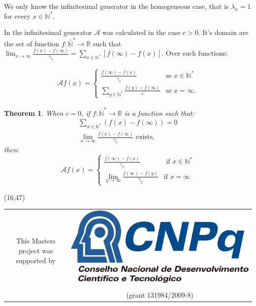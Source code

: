 \documentclass[a1,portrait]{a0poster}
\newtheorem{teorema}{Theorem}
\newcommand{\AAA}{{\mathcal{A}}}
\newcommand{\Nz}{{\mathbb{N^*}}}
\newcommand{\Nzb}{{\mathbb{\overline{N}^*}}}
\newcommand{\R}{{\mathbb{R}}}
\begin{document}
\begin{textblock}{15}
We only know the infinitesimal generator in the homogeneous case, that
is $\lambda_x = 1$ for every $x \in \Nz$.

In \cite{kendall:56} the infinitesimal generator $\AAA$ was calculated
in the case $c > 0$. It's domain are the set of function $f: \Nzb \to
\R$ such that $\lim_{x \to \infty} \frac{f(x) - f(\infty)}{\gamma_x} =
\sum_{x \in \Nz} [f(\infty) - f(x)]$. Over such functions:

\begin{align*}
  \AAA f (x) = \begin{cases}
    \displaystyle
    \frac{f(\infty) - f(x)}{\gamma_x} & \text{se } x \in \Nz\\
    \displaystyle
    \sum_{y\in \Nz} \frac{f(y) - f(\infty)}{c} & \text{se } x = \infty.
  \end{cases}
\end{align*}


\begin{teorema}
  When $c = 0$, if $f: \Nzb \to \R$ is a function such that: 
  \begin{gather*}
    \sum_{x\in \Nz} \left( f(x)-f(\infty)\right) = 0\\
    \lim_{x \to \infty} \frac{f(x) - f(\infty)}{\gamma_x} \textrm{ exists},
  \end{gather*}
  then:
  \begin{displaymath}
    \AAA f(x) = \begin{cases}
      \frac{f(\infty)- f(x)}{\gamma_x} & \text{ if } x \in \Nz \\
      \lim_{y \to \infty} \frac{f(\infty) - f(y)}{\gamma_y} & \text{
        if } x = \infty
    \end{cases}  
  \end{displaymath}
\end{teorema}

\nocite{fontes:08}
\nocite{gabriel:11}


\end{textblock}

\begin{textblock}{15}(16,47)
\begin{center}
  \begin{tabular}{cc}
    & \multirow{2}{*}{\includegraphics[scale = 2.5]{cnpq.jpg}} \\
    This Masters project was supported by & \\ \\
    & {\small (grant 131984/2009-8)}\\
  \end{tabular}
\end{center}
\end{textblock}
\end{document}
